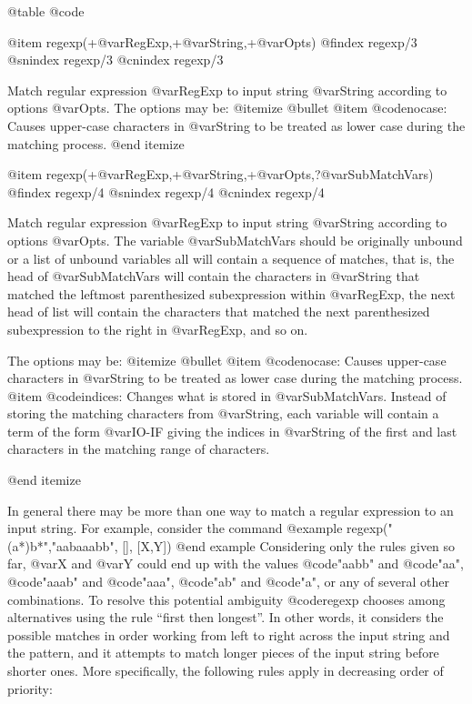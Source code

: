 {{{{{{{{{@table @code

@item regexp(+@var{RegExp},+@var{String},+@var{Opts})
@findex regexp/3
@snindex regexp/3
@cnindex regexp/3

Match regular expression @var{RegExp} to input string @var{String}
according to options @var{Opts}. The options may be:
@itemize @bullet
@item @code{nocase}: Causes upper-case characters  in  @var{String} to
        be treated  as  lower case during the matching process.
@end itemize

@item regexp(+@var{RegExp},+@var{String},+@var{Opts},?@var{SubMatchVars})
@findex regexp/4
@snindex regexp/4
@cnindex regexp/4

Match regular expression @var{RegExp} to input string @var{String}
according to options @var{Opts}. The variable @var{SubMatchVars} should
be originally unbound or a list of unbound variables all will contain a
sequence of matches, that is, the head of @var{SubMatchVars} will
contain the characters in @var{String} that matched the leftmost
parenthesized subexpression within @var{RegExp}, the next head of list
will contain the characters that matched the next parenthesized
subexpression to the right in @var{RegExp}, and so on.

The options may be:
@itemize @bullet
@item @code{nocase}: Causes upper-case characters  in  @var{String} to
        be treated  as  lower case during the matching process.
@item @code{indices}: Changes what  is  stored  in
@var{SubMatchVars}. Instead  of storing the matching characters from
@var{String}, each variable will contain a term of the form @var{IO-IF}
giving the indices in @var{String} of the first and last characters  in
the  matching range of characters.

@end itemize

In general there may be more than one way to match a regular expression
to an input string.  For example,  consider the command
@example
  regexp("(a*)b*","aabaaabb", [], [X,Y])
@end example
Considering only the rules given so far, @var{X} and @var{Y} could end up
with the values @code{"aabb"} and @code{"aa"}, @code{"aaab"} and
@code{"aaa"}, @code{"ab"} and @code{"a"}, or any of several other
combinations.  To resolve this potential ambiguity @code{regexp} chooses among
alternatives using the rule ``first then longest''.  In other words, it
considers the possible matches in order working from left to right
across the input string and the pattern, and it attempts to match longer
pieces of the input string before shorter ones.  More specifically, the
following rules apply in decreasing order of priority:


}}}}}}}}}
